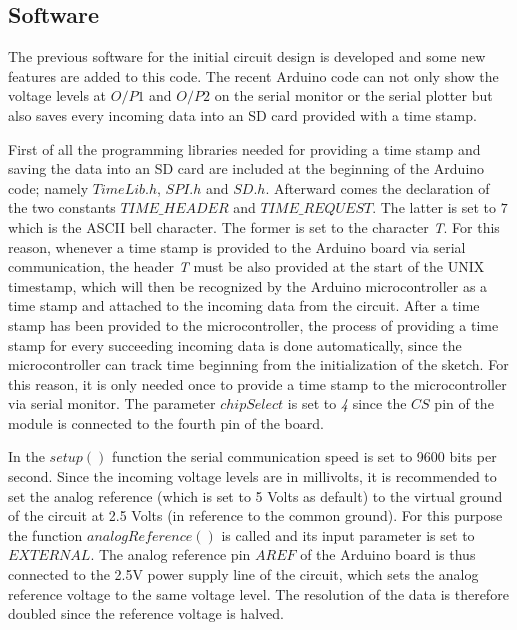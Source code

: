 \subsection{Software}
The previous software for the initial circuit design is developed and some new features are added to this code. The recent Arduino code can not only show the voltage levels at $O/P1$ and $O/P2$ on the serial monitor or the serial plotter but also saves every incoming data into an SD card provided with a time stamp.\par 
First of all the programming libraries needed for providing a time stamp and saving the data into an SD card are included at the beginning of the Arduino code; namely $TimeLib.h$, $SPI.h$ and $SD.h$. Afterward comes the declaration of the two constants $TIME\_HEADER$ and $TIME\_REQUEST$. The latter is set to $7$ which is the ASCII bell character. The former is set to the character \textit{T}. For this reason, whenever a time stamp is provided to the Arduino board via serial communication, the header \textit{T} must be also provided at the start of the UNIX timestamp, which will then be recognized by the Arduino microcontroller as a time stamp and attached to the incoming data from the circuit. After a time stamp has been provided to the microcontroller, the process of providing a time stamp for every succeeding incoming data is done automatically, since the microcontroller can track time beginning from the initialization of the sketch. For this reason, it is only needed once to provide a time stamp to the microcontroller via serial monitor. The parameter $chipSelect$ is set to \textit{4} since the $CS$ pin of the module is connected to the fourth pin of the board. \par
In the $setup()$ function the serial communication speed is set to 9600 bits per second. Since the incoming voltage levels are in millivolts, it is recommended to set the analog reference (which is set to 5 Volts as default) to the virtual ground of the circuit at 2.5 Volts (in reference to the common ground). For this purpose the function $analogReference()$ is called and its input parameter is set to $EXTERNAL$. The analog reference pin $AREF$ of the Arduino board is thus connected to the 2.5V power supply line of the circuit, which sets the analog reference voltage to the same voltage level. The resolution of the data is therefore doubled since the reference voltage is halved.\par
